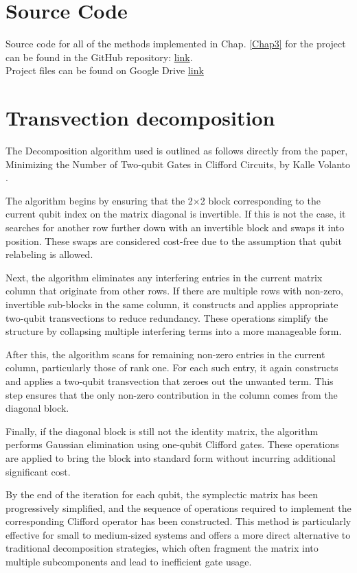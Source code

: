 \documentclass[12pt, a4paper]{report}
\begin{document}
\begin{appendices}
\chapter{Source Code} \label{Appendix A}
Source code for all of the methods implemented in Chap. \ref{Chap3} for the project can be found in the GitHub repository: \newline \url{link}. \newline \\
Project files can be found on Google Drive \url{link}

\chapter{Transvection decomposition} \label{Appendix B}
The Decomposition algorithm used is outlined as follows directly from the paper, Minimizing the Number of Two-qubit Gates in Clifford Circuits, by Kalle Volanto \cite{volanto2023minimizing}.

The algorithm begins by ensuring that the 2×2 block corresponding to the current qubit index on the matrix diagonal is invertible. If this is not the case, it searches for another row further down with an invertible block and swaps it into position. These swaps are considered cost-free due to the assumption that qubit relabeling is allowed.

Next, the algorithm eliminates any interfering entries in the current matrix column that originate from other rows. If there are multiple rows with non-zero, invertible sub-blocks in the same column, it constructs and applies appropriate two-qubit transvections to reduce redundancy. These operations simplify the structure by collapsing multiple interfering terms into a more manageable form.

After this, the algorithm scans for remaining non-zero entries in the current column, particularly those of rank one. For each such entry, it again constructs and applies a two-qubit transvection that zeroes out the unwanted term. This step ensures that the only non-zero contribution in the column comes from the diagonal block.

Finally, if the diagonal block is still not the identity matrix, the algorithm performs Gaussian elimination using one-qubit Clifford gates. These operations are applied to bring the block into standard form without incurring additional significant cost.

By the end of the iteration for each qubit, the symplectic matrix has been progressively simplified, and the sequence of operations required to implement the corresponding Clifford operator has been constructed. This method is particularly effective for small to medium-sized systems and offers a more direct alternative to traditional decomposition strategies, which often fragment the matrix into multiple subcomponents and lead to inefficient gate usage.


\end{appendices}
\end{document}
